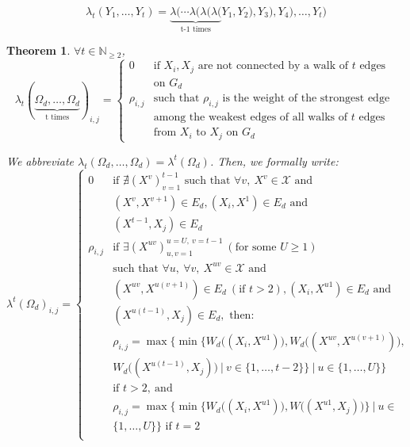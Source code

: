 \documentclass{article} %
\newtheorem{theorem}{Theorem}
\begin{document}
\[
  \lambda_t(Y_1,\ldots, Y_t) =
    \underbrace{\lambda(\cdots\lambda(\lambda(\lambda(}_\text{t-1 times}
    Y_1,Y_2),Y_3),Y_4),\ldots, Y_t)
\]

\begin{theorem}
\label{thm:Theorem 3}
$\forall t\in \mathbb{N}_{\geq2}$,
\[
  \lambda_t(\underbrace{\Omega_d,\ldots,\Omega_d}_\text{t times})_{i,j}=
  \begin{cases}
  0 & \textrm{if } X_i, X_j\textrm{ are not connected by a walk of }t \textrm{ edges} \\
  & \textrm{on }G_d \\
  \rho_{i,j} & \textrm{such that }\rho_{i,j}\textrm{ is the weight of the strongest edge } \\
  &\textrm{among the weakest edges of all walks of } t \textrm{ edges} \\
  & \textrm{from }X_i\textrm{ to }X_j \textrm{ on } G_d
  \end{cases}
\]

We abbreviate $\lambda_t(\Omega_d,\ldots,\Omega_d)=\lambda^t(\Omega_d)$. Then, we formally write:
\[
  \lambda^t(\Omega_d)_{i,j}=
  \begin{cases}
  0 & \textrm{if } \nexists (X^v)_{v=1}^{t-1} \textrm{ such that } \forall v,\ X^v\in\mathcal{X}\textrm{ and } \\
  & (X^v,X^{v+1})\in E_d, (X_i,X^1)\in E_d \textrm{ and } \\
  & (X^{t-1},X_j)\in E_d\\ 
  \rho_{i,j} & \textrm{if }\exists (X^{uv})_{u,v=1}^{u=U,\ v=t-1}\ (\textrm{for some }U\geq1) \\
  & \textrm{such that }\forall u,\ \forall v,\ X^{uv}\in\mathcal{X} \textrm{ and } \\
  & (X^{uv},X^{u(v+1)})\in E_d\ (\textrm{if }t>2), (X_i, X^{u1})\in E_d \textrm{ and } \\
  & (X^{u(t-1)},X_j)\in E_d, \textrm{ then: } \\
  & \rho_{i,j}=\max\Big\{\min\big\{W_d\big((X_i,X^{u1})\big),W_d\big((X^{uv},X^{u(v+1)})\big), \\
  & W_d\big((X^{u(t-1)},X_j)\big)\ |\ v\in\{1,\ldots,t-2\}\big\}\ |\ u\in\{1,\ldots,U\}\Big\} \\
  &\textrm{if } t>2,\ \textrm{and }\\
  &\rho_{i,j}=\max\Big\{\min\big\{W_d\big((X_i,X^{u1})\big), W\big((X^{u1},X_j)\big)\big\}\ |\ u\in\\
  &\{1,\ldots,U\}\Big\} \textrm{ if } t=2\\
  \end{cases}
\]
\end{theorem}
\end{document}
